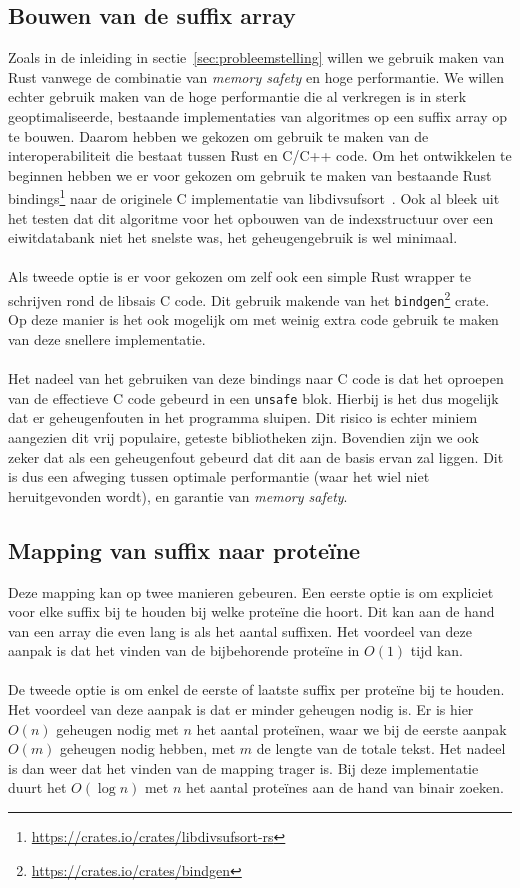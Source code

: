 \subsection{Bouwen van de suffix array}\label{subsec:bouwen-van-de-suffix-array}
Zoals in de inleiding in sectie~\ref{sec:probleemstelling} willen we gebruik maken van Rust vanwege de combinatie van \textit{memory safety} en hoge performantie.
We willen echter gebruik maken van de hoge performantie die al verkregen is in sterk geoptimaliseerde, bestaande implementaties van algoritmes op een suffix array op te bouwen.
Daarom hebben we gekozen om gebruik te maken van de interoperabiliteit die bestaat tussen Rust en C/C++ code.
Om het ontwikkelen te beginnen hebben we er voor gekozen om gebruik te maken van bestaande Rust bindings\footnote{\url{https://crates.io/crates/libdivsufsort-rs}} naar de originele C implementatie van libdivsufsort~\cite{libdivsufsort}.
Ook al bleek uit het testen dat dit algoritme voor het opbouwen van de indexstructuur over een eiwitdatabank niet het snelste was, het geheugengebruik is wel minimaal.
\\ \\
Als tweede optie is er voor gekozen om zelf ook een simple Rust wrapper te schrijven rond de libsais C code.
Dit gebruik makende van het \texttt{bindgen}\footnote{\url{https://crates.io/crates/bindgen}} crate.
Op deze manier is het ook mogelijk om met weinig extra code gebruik te maken van deze snellere implementatie.
\\ \\
Het nadeel van het gebruiken van deze bindings naar C code is dat het oproepen van de effectieve C code gebeurd in een \texttt{unsafe} blok.
Hierbij is het dus mogelijk dat er geheugenfouten in het programma sluipen.
Dit risico is echter miniem aangezien dit vrij populaire, geteste bibliotheken zijn.
Bovendien zijn we ook zeker dat als een geheugenfout gebeurd dat dit aan de basis ervan zal liggen.
Dit is dus een afweging tussen optimale performantie (waar het wiel niet heruitgevonden wordt), en garantie van \textit{memory safety}.

\subsection{Mapping van suffix naar proteïne}\label{subsec:mapping-van-suffix-naar-proteine}
Deze mapping kan op twee manieren gebeuren.
Een eerste optie is om expliciet voor elke suffix bij te houden bij welke proteïne die hoort.
Dit kan aan de hand van een array die even lang is als het aantal suffixen.
Het voordeel van deze aanpak is dat het vinden van de bijbehorende proteïne in $O(1)$ tijd kan.
\\ \\
De tweede optie is om enkel de eerste of laatste suffix per proteïne bij te houden.
Het voordeel van deze aanpak is dat er minder geheugen nodig is.
Er is hier $O(n)$ geheugen nodig met $n$ het aantal proteïnen, waar we bij de eerste aanpak $O(m)$ geheugen nodig hebben, met $m$ de lengte van de totale tekst.
Het nadeel is dan weer dat het vinden van de mapping trager is.
Bij deze implementatie duurt het $O(\log n)$ met $n$ het aantal proteïnes aan de hand van binair zoeken.

